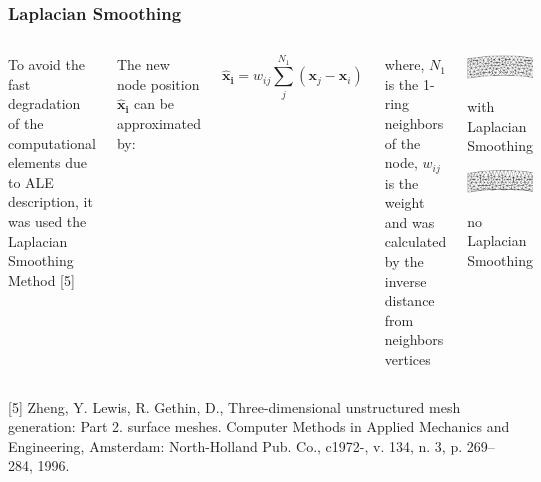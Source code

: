 




\begin{frame}
 \frametitle{\LARGE Laplacian Smoothing}

\vspace{-0.8cm}
\begin{columns}[c]
\justifying
To avoid the fast degradation of the computational elements
due to ALE description, it was used the Laplacian Smoothing Method [5]

\smallskip
The new node position $\mathbf{\hat{x}_{i}}$ can be approximated by:

\begin{equation*}
\mathbf{\hat{x}_{i}} = w_{ij} \sum_{j}^{N_{1}} (\mathbf{x}_{j} - \mathbf{x}_{i})
\end{equation*}

\smallskip
where,
$N_{1}$ is the 1-ring neighbors of the node,
$w_{ij}$ is the weight and was calculated by the inverse distance from neighbors vertices


\vspace{-1cm}
\begin{center}
  \includegraphics[scale=0.2]{images/Smoothing.png}
  \caption{\scriptsize with Laplacian Smoothing}

  \vspace{1.0cm}
  \includegraphics[scale=0.2]{images/noSmoothing.png}
  \caption{\scriptsize no Laplacian Smoothing}
\end{center}
\end{columns}

\vspace{1cm}
\tiny [5] Zheng,  Y.  Lewis,  R.  Gethin,  D., Three-dimensional unstructured mesh generation: Part 2. surface meshes. Computer Methods in Applied Mechanics and Engineering, Amsterdam: North-Holland Pub. Co., c1972-, v. 134, n. 3, p. 269–284, 1996.
\end{frame}







